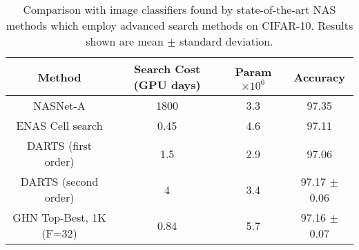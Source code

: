 \begin{table}[t]
\vspace{-0.5cm}
\caption{Comparison with image classifiers found by state-of-the-art NAS methods which employ advanced search methods on CIFAR-10. Results shown are mean $\pm$ standard deviation.}
\label{table:Results2}
\vspace{-0.2cm}
\footnotesize
\begin{center}
\begin{tabular}{ c c c c } 
Method & Search Cost (GPU days) & Param $\times 10^6$ & Accuracy   \\ 
\hline
NASNet-A  \citep{zoph2017learning} & 1800 & 3.3 & 97.35 \\
ENAS Cell search  \citep{pham2018efficient} & 0.45  & 4.6 & 97.11 \\
DARTS (first order)  \citep{liu2018darts} &  1.5  & 2.9  & 97.06  \\
DARTS (second order) \citep{liu2018darts} & 4  & 3.4 & 97.17 $\pm$ 0.06\\
\hline
\hline
GHN Top-Best, 1K (F=32) & 0.84  & 5.7 & 97.16 $\pm$ 0.07 \\
\end{tabular}
\end{center}
\end{table}
